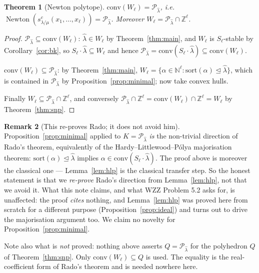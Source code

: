 \documentclass[11pt]{article}
\theoremstyle{plain}
\newtheorem{thm}{Theorem}[section]
\theoremstyle{definition}
\newtheorem{rem}[thm]{Remark}
\DeclareMathOperator{\Newton}{Newton}
\newcommand{\Z}{\mathbb{Z}}
\newcommand{\N}{\mathbb{N}}
\begin{document}
\begin{thm}[Newton polytope]\label{thm:newton}
$\mathrm{conv}(W_\ell)=\mathcal{P}_{\hat\lambda}$, i.e.\
$\Newton(s^{c}_{\lambda/\mu}(x_1,\dots,x_\ell))=\mathcal{P}_{\hat\lambda}$. Moreover
$W_\ell=\mathcal{P}_{\hat\lambda}\cap\Z^{\ell}$.
\end{thm}

\begin{proof}
$\mathcal{P}_{\hat\lambda}\subseteq\mathrm{conv}(W_\ell)$: $\hat\lambda\in W_\ell$ by
Theorem~\ref{thm:main}, and $W_\ell$ is $S_\ell$-stable by Corollary~\ref{cor:bk}, so
$S_\ell\cdot\hat\lambda\subseteq W_\ell$ and hence
$\mathcal{P}_{\hat\lambda}=\mathrm{conv}(S_\ell\cdot\hat\lambda)\subseteq\mathrm{conv}(W_\ell)$.

$\mathrm{conv}(W_\ell)\subseteq\mathcal{P}_{\hat\lambda}$: by Theorem~\ref{thm:main},
$W_\ell=\{\alpha\in\N^{\ell}:\mathrm{sort}(\alpha)\trianglelefteq\hat\lambda\}$, which is
contained in $\mathcal{P}_{\hat\lambda}$ by Proposition~\ref{prop:minimal}; now take convex
hulls.

Finally $W_\ell\subseteq\mathcal{P}_{\hat\lambda}\cap\Z^{\ell}$, and conversely
$\mathcal{P}_{\hat\lambda}\cap\Z^{\ell}=\mathrm{conv}(W_\ell)\cap\Z^{\ell}=W_\ell$ by
Theorem~\ref{thm:snp}.
\end{proof}

\begin{rem}[This re-proves Rado; it does not avoid him]\label{rem:rado}
Proposition~\ref{prop:minimal} applied to $K=\mathcal{P}_{\hat\lambda}$ \emph{is} the
non-trivial direction of Rado's theorem, equivalently of the Hardy--Littlewood--P\'olya
majorisation theorem: $\mathrm{sort}(\alpha)\trianglelefteq\hat\lambda$ implies
$\alpha\in\mathrm{conv}(S_\ell\cdot\hat\lambda)$. The proof above is moreover the classical one
--- Lemma~\ref{lem:hlp} is the classical transfer step. So the honest statement is that we
\emph{re-prove} Rado's direction from Lemma~\ref{lem:hlp}, not that we avoid it. What this note
claims, and what WZZ Problem 5.2 asks for, is unaffected: the proof \emph{cites} nothing, and
Lemma~\ref{lem:hlp} was proved here from scratch for a different purpose
(Proposition~\ref{prop:ideal}) and turns out to drive the majorisation argument too. We claim no
novelty for Proposition~\ref{prop:minimal}.

Note also what is \emph{not} proved: nothing above asserts $Q=\mathcal{P}_{\hat\lambda}$ for the
polyhedron $Q$ of Theorem~\ref{thm:snp}. Only $\mathrm{conv}(W_\ell)\subseteq Q$ is used. The
equality is the real-coefficient form of Rado's theorem and is needed nowhere here.
\end{rem}
\end{document}
